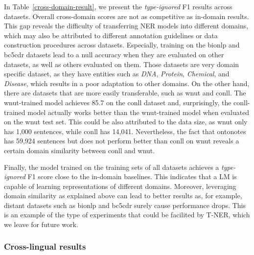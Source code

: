 \documentclass[11pt,a4paper]{article}
\begin{document}
In Table~\ref{cross-domain-result}, we present the {\it type-ignored} F1 results across datasets. Overall cross-domain scores are not as competitive as in-domain results. This gap reveals the difficulty of transferring NER models into different domains, which may also be attributed to different annotation guidelines or data construction procedures across datasets. Especially, training on the bionlp and bc5cdr datasets lead to a null accuracy when they are evaluated on other datasets, as well as others evaluated on them. Those datasets are very domain specific dataset, as they have entities such as {\it DNA}, {\it Protein}, {\it Chemical}, and {\it Disease}, which results in a poor adaptation to other domains. On the other hand, there are datasets that are more easily transferable, such as wnut and conll. The wnut-trained model achieves 85.7 on the conll dataset and, surprisingly, the conll-trained model actually works better than the wnut-trained model when evaluated on the wnut test set.
This could be also attributed to the data size, as wnut only has 1,000 sentences, while conll has 14,041. Nevertheless, the fact that ontonotes has 59,924 sentences but does not perform better than conll on wnut reveals a certain domain similarity between conll and wnut.

Finally, the model trained on the training sets of all datasets achieves a \textit{type-ignored} F1 score close to the in-domain baselines.
This indicates that a LM is capable of learning representations of different domains. Moreover, leveraging domain similarity as explained above can lead to better results as, for example, distant datasets such as bionlp and bc5cdr surely cause performance drops. This is an example of the type of experiments that could be facilited by T-NER, which we leave for future work.

\subsubsection{Cross-lingual results}
\label{crosslingualresults}
\end{document}
